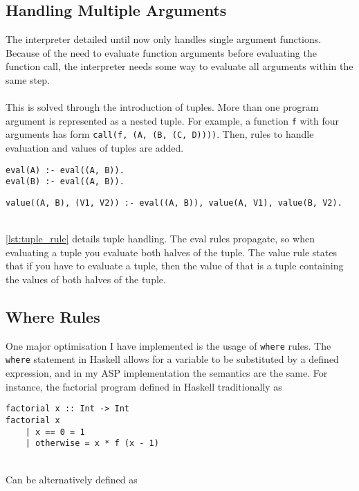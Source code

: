 \subsection{Handling Multiple Arguments}
The interpreter detailed until now only handles single argument functions. Because of the need to evaluate function arguments before evaluating the function call, the interpreter needs some way to evaluate all arguments within the same step. \\ \\
This is solved through the introduction of tuples. More than one program argument is represented as a nested tuple. For example, a function \lstinline!f! with four arguments has form \lstinline!call(f, (A, (B, (C, D))))!. Then, rules to handle evaluation and values of tuples are added. 

\begin{lstlisting}[caption={Tuple rules}, label={lst:tuple_rule}, firstnumber=139]
eval(A) :- eval((A, B)).
eval(B) :- eval((A, B)).
\end{lstlisting}

\begin{lstlisting}[firstnumber=124]
value((A, B), (V1, V2)) :- eval((A, B)), value(A, V1), value(B, V2).
\end{lstlisting}
\mbox{}\\
\ref{lst:tuple_rule} details tuple handling. The eval rules propagate, so when evaluating a tuple you evaluate both halves of the tuple. The value rule states that if you have to evaluate a tuple, then the value of that is a tuple containing the values of both halves of the tuple.

\subsection{Where Rules}
One major optimisation I have implemented is the usage of \lstinline!where! rules. The \lstinline!where! statement in Haskell allows for a variable to be substituted by a defined expression, and in my ASP implementation the semantics are the same. For instance, the factorial program defined in Haskell traditionally as \\

\begin{lstlisting}
factorial x :: Int -> Int
factorial x 
	| x == 0 = 1
	| otherwise = x * f (x - 1)
\end{lstlisting}
\mbox{}\\
Can be alternatively defined as \\

